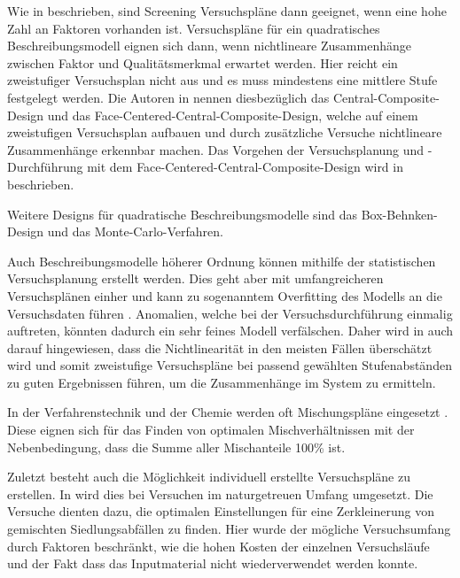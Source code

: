 Wie in \citet{Siebertz2016} beschrieben, sind Screening Versuchspläne dann geeignet, wenn eine hohe Zahl an Faktoren vorhanden ist. Versuchspläne für ein quadratisches Beschreibungsmodell eignen sich dann, wenn nichtlineare Zusammenhänge zwischen Faktor und Qualitätsmerkmal erwartet werden. Hier reicht ein zweistufiger Versuchsplan nicht aus und es muss mindestens eine mittlere Stufe festgelegt werden.
Die Autoren in \citet{Siebertz2016} nennen diesbezüglich das Central-Composite-Design und das Face-Centered-Central-Composite-Design, welche auf einem zweistufigen Versuchsplan aufbauen und durch zusätzliche Versuche nichtlineare Zusammenhänge erkennbar machen. Das Vorgehen der Versuchsplanung und -Durchführung mit dem Face-Centered-Central-Composite-Design wird in \citet{Qin2009} beschrieben.


Weitere Designs für quadratische Beschreibungsmodelle sind das Box-Behnken-Design und das Monte-Carlo-Verfahren.

Auch Beschreibungsmodelle höherer Ordnung können mithilfe der statistischen Versuchsplanung erstellt werden. Dies geht aber mit umfangreicheren Versuchsplänen einher und kann zu sogenanntem Overfitting des Modells an die Versuchsdaten führen \cite{Siebertz2016}. Anomalien, welche bei der Versuchsdurchführung einmalig auftreten, könnten dadurch ein sehr feines Modell verfälschen.
Daher wird in \citet{Siebertz2016} auch darauf hingewiesen, dass die Nichtlinearität in den meisten Fällen überschätzt wird und somit zweistufige Versuchspläne bei passend gewählten Stufenabständen zu guten Ergebnissen führen, um die Zusammenhänge im System zu ermitteln.


In der Verfahrenstechnik und der Chemie werden oft Mischungspläne eingesetzt \cite{Siebertz2016}. Diese eignen sich für das Finden von optimalen Mischverhältnissen mit der Nebenbedingung, dass die Summe aller Mischanteile 100\% ist.

Zuletzt besteht auch die Möglichkeit individuell erstellte Versuchspläne zu erstellen. In \cite{DoE_MSW} wird dies bei Versuchen im naturgetreuen Umfang umgesetzt. Die Versuche dienten dazu, die optimalen Einstellungen für eine Zerkleinerung von gemischten Siedlungsabfällen zu finden. Hier wurde der mögliche Versuchsumfang durch Faktoren beschränkt, wie die hohen Kosten der einzelnen Versuchsläufe und der Fakt dass das Inputmaterial nicht wiederverwendet werden konnte.



